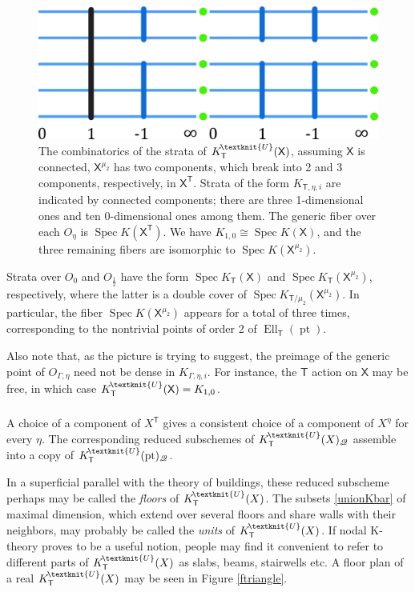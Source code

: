 \documentclass[14pt]{extarticle}
\newcommand{\Kn}{K^{\! \tiny\textknit{U}}}
\newcommand{\bT}{\mathsf{T}}
\newcommand{\bX}{\mathsf{X}}
\newcommand{\cQ}{\mathscr{Q}}
\DeclareMathOperator{\Ell}{Ell}
\DeclareMathOperator{\pt}{pt}
\DeclareMathOperator{\Spec}{Spec}
\theoremstyle{definition}
\begin{document}
\begin{figure}[!h]
  \centering
  \includegraphics[scale=0.75]{floors1.png}
  \caption{The combinatorics of the strata of $\Kn_{\bT}(\bX)$, assuming
    $\bX$ is connected, $\bX^{\mu_2}$ has two components, which
   break into 2 and 3 components, respectively, in $\bX^\bT$. Strata of
   the form $K_{\bT, \eta,  i}$ are indicated by connected
   components; there are three 1-dimensional ones and ten
   0-dimensional ones among them. The generic fiber over each
   $O_{\eta}$ is $\Spec K(\bX^\bT)$. We have
   $K_{1,0} \cong \Spec K(\bX)$, and the three remaining fibers are
   isomorphic to $\Spec K(\bX^{\mu_2})$.}
\label{ffloor}
\end{figure}

Strata over $O_{0}$ and $O_{\frac12}$ have the form $\Spec K_\bT(\bX)$ and
$\Spec K_\bT(\bX^{\mu_2})$, respectively, where the latter is a double cover of
$\Spec K_{\bT/\mu_2}(\bX^{\mu_2})$. In particular, the fiber $\Spec K(\bX^{\mu_2})$ appears
for a total of three times, corresponding to the nontrivial points of
order 2 of $\Ell_\bT(\pt)$. 

Also note that, as the picture is trying to suggest, the preimage of the
generic point of $ O_{\Gamma, \eta}$ need not be dense in
$K_{\Gamma, \eta,  i}$. For instance, the $\bT$ action on $\bX$ may be
free, in which case $\Kn_{\bT}(\bX)= K_{1,0}$. 

\subsubsection{}


A choice of a component of $X^\bT$ gives a consistent choice of
a component of $X^\eta$ for every $\eta$. The corresponding reduced
subschemes of $\Kn_\bT(X)_\cQ$ assemble into a copy of
$\Kn_\bT(\pt)_\cQ$. 

In a superficial parallel with the theory of buildings, these reduced
subscheme perhaps
may be called the \emph{floors} of $\Kn_\bT(X)$.  The subsets
\eqref{unionKbar} of maximal dimension,
which extend over several floors and share walls with their neighbors, may
probably be called the \emph{units} of $\Kn_\bT(X)$.  If
nodal K-theory proves to be a useful notion, people may 
find it
convenient to refer to different parts of $\Kn_\bT(X)$ as slabs,
beams, stairwells etc. A floor plan of a real $\Kn_\bT(X)$ may be
seen in Figure \ref{ftriangle}. 
\end{document}
